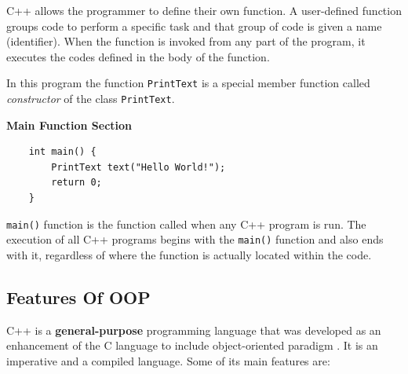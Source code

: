 \documentclass[main]{subfiles}
\begin{document}
C++ allows the programmer to define their own function. A user-defined function groups code to perform a specific task and that group of code is given a name (identifier). When the function is invoked from any part of the program, it executes the codes defined in the body of the function.

In this program the function \texttt{PrintText} is a special member function called \textit{constructor} of the class \texttt{PrintText}.

\textbf{Main Function Section}
\begin{verbatim}
    int main() {
        PrintText text("Hello World!");
        return 0;
    }
\end{verbatim}

\texttt{main()} function is the function called when any C++ program is run. The execution of all C++ programs begins with the \texttt{main()} function and also ends with it, regardless of where the function is actually located within the code.


\subsection{Features Of OOP}
C++ is a \textbf{general-purpose} programming language that was developed as an enhancement of the C language to include object-oriented paradigm \cite{geeksforgeeks_2020_features}. It is an imperative and a compiled language. Some of its main features are:
\end{document}

